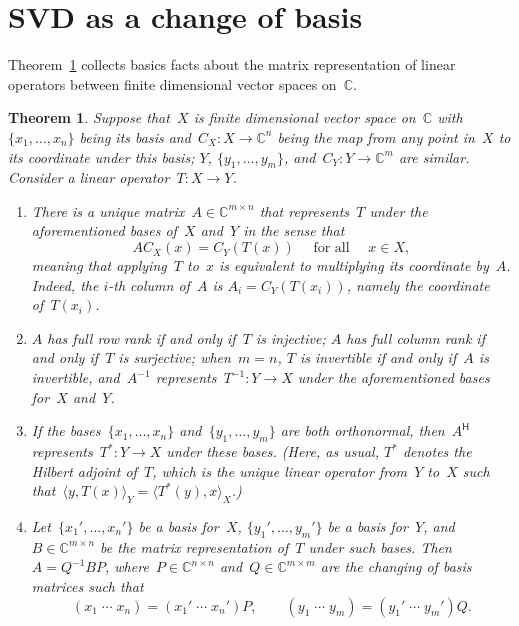 \documentclass[11pt,a4paper]{article}  %
\numberwithin{equation}{section}
\newtheorem{theorem}{Theorem}%
\theoremstyle{definition}
\def\CC{\mathbb{C}}
\newcommand{\sss}[1]{{\scriptscriptstyle{#1}}}
\newcommand{\hmt}{{\scriptscriptstyle{{\mathsf{H}}}}}
\newcommand{\inv}{{-1}}
\newcommand{\adj}{*}
\newcommand{\range}{\mathrm{range}}
\begin{document}
\section{SVD as a change of basis}


Theorem~\ref{th:matrix} collects basics facts about the matrix representation of linear operators
between finite dimensional vector spaces on~$\CC$.

\begin{theorem}
  \label{th:matrix}
  Suppose that~$X$ is finite dimensional vector space on~$\CC$ with $\{x_1,  \dots,
  x_n\}$ being its basis and~$C_\sss{X} : X \to \CC^{n}$ being the map from any point in~$X$ to its
  coordinate under this basis; $Y$, $\{y_1, \dots, y_m\}$, and~$C_\sss{Y} : Y \to \CC^{m}$ are similar.
  Consider a linear operator~$T \mathrel{:} X \to Y$.
  \begin{enumerate}[leftmargin=1.5em]
    \item There is a unique matrix~$A\in \CC^{m\times n}$
   that represents~$T$ under the aforementioned bases of~$X$ and~$Y$ in the sense that
  \begin{equation*}
    A C_\sss{X} (x) = C_\sss{Y} (T (x)) \quad \text{ for all } \quad x\in X,
  \end{equation*}
  meaning that applying~$T$ to~$x$ is equivalent to multiplying its coordinate by~$A$.
  Indeed, the $i$-th column of~$A$ is $A_i = C_\sss{Y}(T(x_i))$, namely the coordinate of~$T(x_i)$.
\item $A$ has full row rank if and only if~$T$ is injective; $A$ has full column rank if and only
  if~$T$ is surjective;
  when~$m=n$, $T$ is invertible if and only if~$A$ is invertible, and~$A^\inv$
  represents~$T^\inv\mathrel{:} Y\to X$ under the aforementioned bases for~$X$ and~$Y$.
\item If the bases~$\{x_1, \dots, x_n\}$ and~$\{y_1, \dots, y_m\}$ are both orthonormal,
    then~$A^\hmt$ represents~$T^\adj \mathrel{:} Y \to X$ under these bases.
    \textnormal{(}Here, as usual,
    $T^*$ denotes the Hilbert adjoint of~$T$, which is the unique linear operator from~$Y$
to~$X$ such that~$\langle y, T(x) \rangle_\sss{Y} = \langle T^\adj(y), x\rangle_\sss{X}$.\textnormal{)}
\item Let~$\{x_1', \dots, x_n'\}$ be a basis for~$X$, $\{y_1', \dots, y_m'\}$ be a
  basis for~$Y$, and~$B\in \CC^{m\times n}$ be the matrix representation of~$T$ under such bases.
  Then~$A = Q^\inv B P$, where~$P\in \CC^{n\times n}$ and~$Q\in \CC^{m \times m}$
  are the changing of basis matrices such that
  \begin{equation*}
    (x_1\; \cdots\; x_n) = (x_1'\; \cdots\; x_n')P, \qquad
    (y_1\; \cdots\; y_m) = (y_1'\; \cdots\; y_m')Q.
  \end{equation*}
  \end{enumerate}
\end{theorem}
\end{document}

